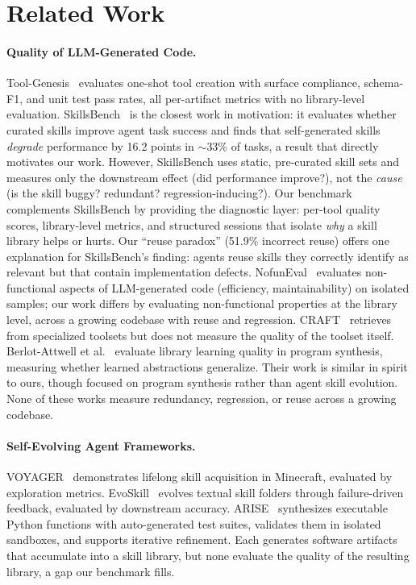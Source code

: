 \documentclass[sigplan,review,anonymous]{acmart}
\begin{document}
\section{Related Work}

\paragraph{Quality of LLM-Generated Code.} Tool-Genesis~\cite{xia2026toolgenesis} evaluates one-shot tool creation with surface compliance, schema-F1, and unit test pass rates, all per-artifact metrics with no library-level evaluation. SkillsBench~\cite{skillsbench2026} is the closest work in motivation: it evaluates whether curated skills improve agent task success and finds that self-generated skills \emph{degrade} performance by 16.2 points in $\sim$33\% of tasks, a result that directly motivates our work. However, SkillsBench uses static, pre-curated skill sets and measures only the downstream effect (did performance improve?), not the \emph{cause} (is the skill buggy? redundant? regression-inducing?). Our benchmark complements SkillsBench by providing the diagnostic layer: per-tool quality scores, library-level metrics, and structured sessions that isolate \emph{why} a skill library helps or hurts. Our ``reuse paradox'' (51.9\% incorrect reuse) offers one explanation for SkillsBench's finding: agents reuse skills they correctly identify as relevant but that contain implementation defects. NofunEval~\cite{singhal2024nofuneval} evaluates non-functional aspects of LLM-generated code (efficiency, maintainability) on isolated samples; our work differs by evaluating non-functional properties at the library level, across a growing codebase with reuse and regression. CRAFT~\cite{yuan2023craft} retrieves from specialized toolsets but does not measure the quality of the toolset itself. Berlot-Attwell et al.~\cite{berlotattwell2026} evaluate library learning quality in program synthesis, measuring whether learned abstractions generalize. Their work is similar in spirit to ours, though focused on program synthesis rather than agent skill evolution. None of these works measure redundancy, regression, or reuse across a growing codebase.

\paragraph{Self-Evolving Agent Frameworks.} VOYAGER~\cite{wang2023voyager} demonstrates lifelong skill acquisition in Minecraft, evaluated by exploration metrics. EvoSkill~\cite{alzubi2026evoskill} evolves textual skill folders through failure-driven feedback, evaluated by downstream accuracy. ARISE~\cite{kaliyev2026arise} synthesizes executable Python functions with auto-generated test suites, validates them in isolated sandboxes, and supports iterative refinement. Each generates software artifacts that accumulate into a skill library, but none evaluate the quality of the resulting library, a gap our benchmark fills.
\end{document}
